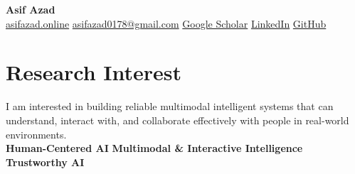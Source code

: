 \documentclass[10pt,letterpaper]{article}
\makeatletter
\newenvironment{entry}
    {\begin{minipage}{\linewidth}\color{textColor}}
    {\end{minipage}}
\newcommand{\daterow}[3]{%
    \begin{tabularx}{\linewidth}{@{}X>{\raggedleft\arraybackslash}p{3.8cm}@{}}
        #1 & \textcolor{mutedColor}{#2}\\
        #3 &
    \end{tabularx}
}
\makeatother
\begin{document}
\begin{center}
    {\fontsize{22pt}{25pt}\selectfont\bfseries\color{primaryColor} Asif Azad}\\[0.32em]
    \href{https://asifazad.online/}{asifazad.online}
    \enspace\textcolor{mutedColor}{\textbar}\enspace
    \href{mailto:asifazad0178@gmail.com}{asifazad0178@gmail.com}
    \enspace\textcolor{mutedColor}{\textbar}\enspace
    \href{https://scholar.google.com/citations?user=nDhZSTQAAAAJ}{Google Scholar}
    \enspace\textcolor{mutedColor}{\textbar}\enspace
    \href{https://www.linkedin.com/in/asifazad2677}{LinkedIn}
    \enspace\textcolor{mutedColor}{\textbar}\enspace
    \href{https://github.com/BRAINIAC2677}{GitHub}
\end{center}
\vspace{-0.35em}

\section{Research Interest}
\begin{entry}
I am interested in building reliable multimodal intelligent systems that can understand, interact with, and collaborate effectively with people in real-world environments.\\[0.38em]
\textbf{Human-Centered AI}
\enspace\textcolor{primaryColor}{\textbullet}\enspace
\textbf{Multimodal \& Interactive Intelligence}
\enspace\textcolor{primaryColor}{\textbullet}\enspace
\textbf{Trustworthy AI}
\end{entry}

\newcommand{\educationsection}{%
\section{Education}
\begin{entry}
\daterow
    {\textbf{Bangladesh University of Engineering and Technology (BUET)}}
    {Feb 2020 -- Mar 2025}
    {B.Sc. in Computer Science and Engineering}
\vspace{0.16em}
\textbf{CGPA:} 3.91/4.00
\enspace\textcolor{mutedColor}{\textbar}\enspace
\textbf{Top 10\%}
\enspace\textcolor{mutedColor}{\textbar}\enspace
\textbf{Dean's List:} three consecutive years\\[0.28em]
\textbf{Undergraduate thesis:}
\href{https://link.springer.com/chapter/10.1007/978-3-032-00652-3_3}{\textit{Beyond Accuracy: Enhancing Parkinson's Diagnosis with Uncertainty Quantification of Machine Learning Models}}\\[0.28em]
\textbf{Supervisor:} \href{https://cse.buet.ac.bd/faculty/faculty_detail/mrahman}{Prof. M Saifur Rahman}
\enspace\textcolor{mutedColor}{\textbar}\enspace
\textbf{Best Paper Award nominee}, AI in Healthcare Conference (AIiH) 2025
\end{entry}
}
\end{document}
